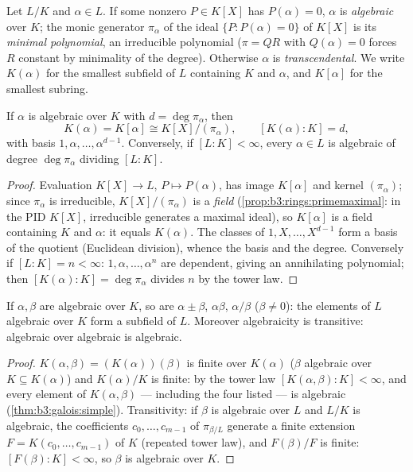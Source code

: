 \begin{definition}\label{def:b3:galois:algebraic}
Let $L/K$ and $\alpha \in L$. If some nonzero $P \in K[X]$ has
$P(\alpha) = 0$, $\alpha$ is \emph{algebraic} over $K$; the monic generator $\pi_\alpha$ of the ideal
$\{P : P(\alpha) = 0\}$ of $K[X]$ is its \emph{minimal
polynomial}, an
irreducible polynomial ($\pi = QR$ with $Q(\alpha) = 0$ forces $R$
constant by minimality of the degree). Otherwise $\alpha$ is
\emph{transcendental}. We write $K(\alpha)$ for the smallest
subfield of $L$ containing $K$ and $\alpha$, and $K[\alpha]$ for
the smallest subring.
\end{definition}

\begin{theorem}\label{thm:b3:galois:simple}
If $\alpha$ is algebraic over $K$ with $d = \deg\pi_\alpha$,
then
\[
K(\alpha) = K[\alpha] \cong K[X]/(\pi_\alpha),
\qquad [K(\alpha) : K] = d,
\]
with basis $1, \alpha, \dots, \alpha^{d-1}$. Conversely, if
$[L:K] < \infty$, every $\alpha \in L$ is algebraic of degree
$\deg \pi_\alpha$ dividing $[L:K]$.
\end{theorem}

\begin{proof}
Evaluation $K[X] \to L$, $P \mapsto P(\alpha)$, has image
$K[\alpha]$ and kernel $(\pi_\alpha)$; since $\pi_\alpha$ is
irreducible, $K[X]/(\pi_\alpha)$ is a \emph{field}
(\cref{prop:b3:rings:primemaximal}: in the PID $K[X]$,
irreducible generates a maximal ideal), so $K[\alpha]$ is a field
containing $K$ and $\alpha$: it equals $K(\alpha)$. The classes
of $1, X, \dots, X^{d-1}$ form a basis of the quotient (Euclidean
division), whence the basis and the degree. Conversely if $[L:K]
= n < \infty$: $1, \alpha, \dots, \alpha^n$ are dependent, giving
an annihilating polynomial; then $[K(\alpha):K] =
\deg\pi_\alpha$ divides $n$ by the tower law.
\end{proof}

\begin{corollary}\label{cor:b3:galois:algclosed}
If $\alpha, \beta$ are algebraic over $K$, so are $\alpha \pm
\beta$, $\alpha\beta$, $\alpha/\beta$ ($\beta \ne 0$): the
elements of $L$ algebraic over $K$ form a subfield of $L$.
Moreover algebraicity is transitive: algebraic over algebraic is
algebraic.
\end{corollary}

\begin{proof}
$K(\alpha, \beta) = (K(\alpha))(\beta)$ is finite over
$K(\alpha)$ ($\beta$ algebraic over $K \subseteq K(\alpha)$) and
$K(\alpha)/K$ is finite: by the tower law $[K(\alpha,\beta):K] <
\infty$, and every element of $K(\alpha, \beta)$ --- including
the four listed --- is algebraic (\cref{thm:b3:galois:simple}).
Transitivity: if $\beta$ is algebraic over $L$ and $L/K$ is
algebraic, the coefficients $c_0, \dots, c_{m-1}$ of
$\pi_{\beta/L}$ generate a finite extension $F = K(c_0, \dots,
c_{m-1})$ of $K$ (repeated tower law), and $F(\beta)/F$ is
finite: $[F(\beta):K] < \infty$, so $\beta$ is algebraic over
$K$.
\end{proof}

